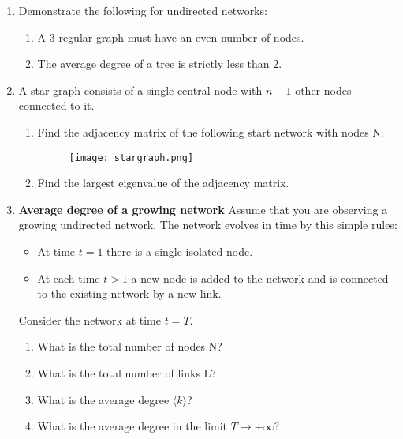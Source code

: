 \documentclass{amsart}
\theoremstyle{definition}
\theoremstyle{remark}
\numberwithin{equation}{section}
\begin{document}
\clearpage
\begin{enumerate}


\item Demonstrate the following for undirected networks:
\begin{enumerate}
\item A 3 regular graph must have an even number of nodes.\vspace{5cm}
\item The average degree of a tree is strictly less than 2.
\end{enumerate}

\vspace{5cm}

\item A star graph consists of a single central node with $n-1$ other nodes connected to it. 
\begin{enumerate}
\item Find the adjacency matrix of the following start network with nodes N:
\begin{figure}[h]
\texttt{[image: stargraph.png]}
\end{figure}
\item Find the largest eigenvalue of the adjacency matrix. 
\end{enumerate}

\clearpage

\item {\bf Average degree of a growing network} Assume that you are observing a growing undirected network.
The network evolves in time by this simple rules:
\begin{itemize}
\item At time $t = 1$ there is a single isolated node.
\item At each time $t > 1$ a new node is added to the network and is connected
to the existing network by a new link.
\end{itemize}
Consider the network at time $t = T$.
\begin{enumerate}
\item What is the total number of nodes N? \vspace{1cm}
\item What is the total number of links L?\vspace{1cm}
\item What is the average degree $\langle k \rangle$?\vspace{1cm}
\item  What is the average degree in the limit $T \rightarrow +\infty $?\vspace{1cm}
\end{enumerate}


\end{enumerate}
\end{document}
